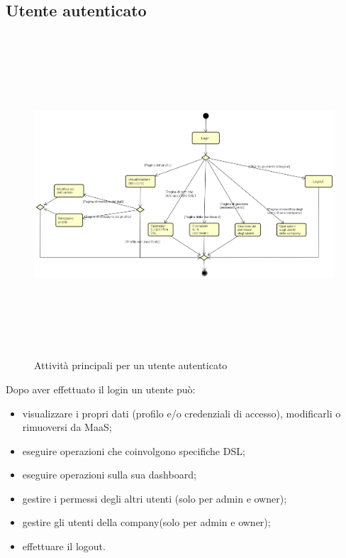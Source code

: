 \subsection{Utente autenticato}
\begin{figure}[H]
\begin{center}
\includegraphics[height=12cm]{res/sections/backend/activities/principaliConAuth.png}
\caption{Attività principali per un utente autenticato}
\end{center}
\end{figure}
Dopo aver effettuato il login un utente può:
\begin{itemize}
\item visualizzare i propri dati (profilo e/o credenziali di accesso), modificarli o rimuoversi da MaaS;
\item eseguire operazioni che coinvolgono specifiche DSL;
\item eseguire operazioni sulla sua dashboard;
\item gestire i permessi degli altri utenti (solo per admin e owner);
\item gestire gli utenti della company(solo per admin e owner);
\item effettuare il logout.
\end{itemize}
